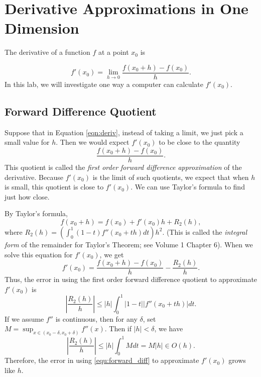 \label{lab:NumericalDerivatives}


\section*{Derivative Approximations in One Dimension}
The derivative of a function $f$ at a point $x_0$ is

\begin{equation}
\label{eqn:deriv}
f'(x_0) = \lim_{h\rightarrow 0} \frac{f(x_0 + h)-f(x_0)}{h}.
\end{equation}
In this lab, we will investigate one way a computer can calculate $f'(x_0)$. 

\subsection*{Forward Difference Quotient}
Suppose that in Equation \ref{eqn:deriv}, instead of taking a limit, we just pick a small value for $h$. 
Then we would expect $f'(x_0)$ to be close to the quantity
\begin{equation}\label{equ:forward_diff}
 \frac{f(x_0 + h)-f(x_0)}{h}.
\end{equation}
This quotient is called the \emph{first order forward difference approximation} of the derivative. 
Because $f'(x_0)$ is the limit of such quotients, we expect that when $h$ is small, this quotient is close to $f'(x_0)$. 
We can use Taylor's formula to find just how close.

By Taylor's formula,
\[
f(x_0+h) = f(x_0) + f'(x_0)h + R_2(h),
\]
where $R_2(h) = \left( \int_0^1 (1-t) f''(x_0+th) dt \right) h^2$. 
(This is called the \emph{integral form} of the remainder for Taylor's Theorem; see Volume 1 Chapter 6). When we solve this equation for $f'(x_0)$, we get
\begin{equation}\label{equ:forward_diff_with_remainder}
f'(x_0) = \frac{f(x_0+h)-f(x_0)}{h} - \frac{R_2(h)}{h}.
\end{equation}
Thus, the error in using the first order forward difference quotient to approximate $f'(x_0)$ is 
\[
\left | \frac{R_2(h)}{h} \right | \leq |h| \int_0^1 |1 - t||f''(x_0+th)|dt.
\]
If we assume $f''$ is continuous, then for any $\delta$, set $M = \sup_{x \in (x_0-\delta, x_0+\delta)} f''(x)$. Then if $|h| < \delta$, we have
\[
\left | \frac{R_2(h)}{h} \right | \leq |h|\int_0^1 M dt = M|h|  {\in}  O(h).
\]
Therefore, the error in using \eqref{equ:forward_diff} to approximate $f'(x_0)$ grows like $h$.



